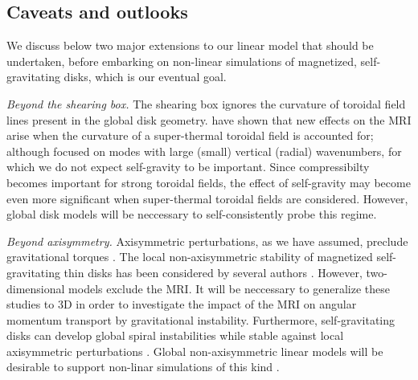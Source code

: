 \subsection{Caveats and outlooks}
We discuss below two major extensions to our linear model that
should be undertaken, before embarking on non-linear simulations of
magnetized, self-gravitating disks, which is our eventual goal.  

\emph{Beyond the shearing box.} The shearing box ignores the curvature
of toroidal field lines present in the global disk 
geometry. \cite{pessah05} have shown that new effects on the MRI arise
when the curvature of a super-thermal toroidal field is accounted for;
although \citeauthor{pessah05} focused on modes with large (small)
vertical (radial) wavenumbers, for which we do not expect self-gravity
to be important. Since compressibilty becomes important for strong
toroidal fields, the effect of self-gravity may become even more
significant when super-thermal toroidal fields are
considered. However, global disk models will be neccessary
to self-consistently probe this regime. 


\emph{Beyond axisymmetry.} Axisymmetric perturbations, as we have
assumed, preclude gravitational torques \citep{lynden-bell72}. 
The local non-axisymmetric stability of magnetized self-gravitating
thin disks has been considered by several authors
\citep{elmegreen87,gammie96b,fan97,kim01}. However, two-dimensional models
exclude the MRI. It will be neccessary to generalize these studies to
3D in order to investigate the impact of the MRI on angular momentum
transport by gravitational instability. Furthermore, self-gravitating
disks can develop global spiral instabilities while stable against local 
axisymmetric perturbations \citep{papaloizou89,papaloizou91}. Global
non-axisymmetric linear models will be desirable to support non-linar
simulations of this kind \citep{fromang04c,fromang05}.   

